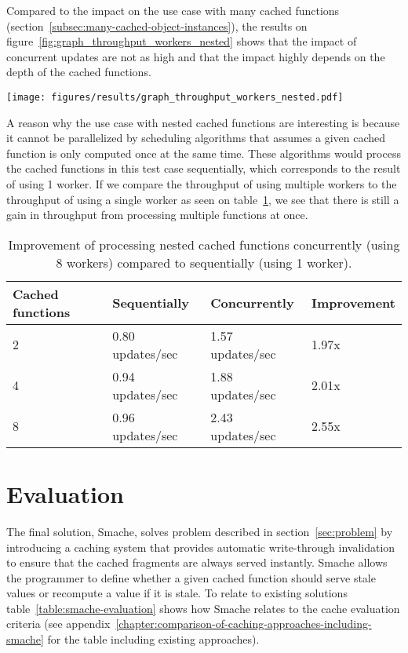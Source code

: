 Compared to the impact on the use case with many cached functions (section~\ref{subsec:many-cached-object-instances}), the results on figure~\ref{fig:graph_throughput_workers_nested} shows that the impact of concurrent updates are not as high and that the impact highly depends on the depth of the cached functions.

\begin{figure*}[ht!]
  \centering
  \texttt{[image: figures/results/graph\_throughput\_workers\_nested.pdf]}
  \caption{How the system scales with nested cached functions while the number of workers is increased}
  \label{fig:graph_throughput_workers_nested}
\end{figure*}

A reason why the use case with nested cached functions are interesting is because it cannot be parallelized by scheduling algorithms that assumes a given cached function is only computed once at the same time. These algorithms would process the cached functions in this test case sequentially, which corresponds to the result of using 1 worker. If we compare the throughput of using multiple workers to the throughput of using a single worker as seen on table~\ref{tab:nested-relative-results}, we see that there is still a gain in throughput from processing multiple functions at once.

\begin{table}[ht!]
  \centering
  \begin{tabular}{llll}
    \hline
    Cached functions & Sequentially & Concurrently & Improvement \\
    \hline
    2 & 0.80 updates/sec & 1.57 updates/sec & 1.97x \\
    4 & 0.94 updates/sec & 1.88 updates/sec & 2.01x \\
    8 & 0.96 updates/sec & 2.43 updates/sec & 2.55x \\
    \hline
  \end{tabular}
  \caption{Improvement of processing nested cached functions concurrently (using 8 workers) compared to sequentially (using 1 worker).}
  \label{tab:nested-relative-results}
\end{table}

\section{Evaluation}
\label{sec:evaluation}

The final solution, Smache, solves problem described in section~\ref{sec:problem} by introducing a caching system that provides automatic write-through invalidation to ensure that the cached fragments are always served instantly. Smache allows the programmer to define whether a given cached function should serve stale values or recompute a value if it is stale. To relate to existing solutions table~\ref{table:smache-evaluation} shows how Smache relates to the cache evaluation criteria (see appendix~\ref{chapter:comparison-of-caching-approaches-including-smache} for the table including existing approaches).

